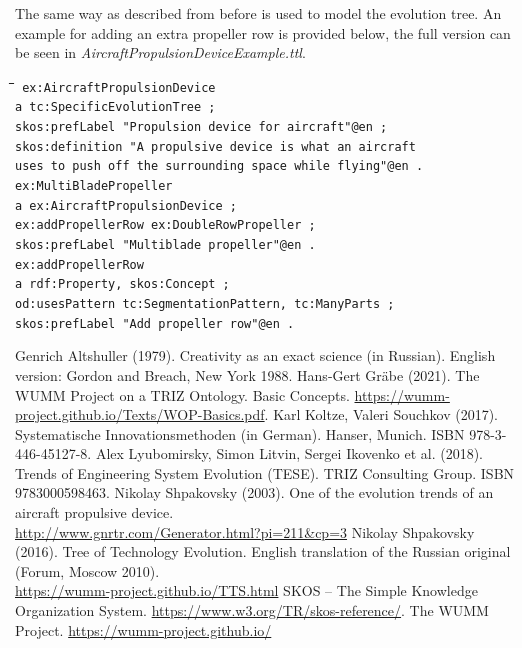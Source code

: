 \documentclass[11pt,a4paper]{article}
\newenvironment{code}{\tt \begin{tabbing}
\hskip12pt\=\hskip12pt\=\hskip12pt\=\hskip12pt\=\hskip5cm\=\hskip5cm\=\kill}
{\end{tabbing}}
\begin{document}
The same way as described from before is used to model the evolution tree. An
example for adding an extra propeller row is provided below, the full version
can be seen in \textit{AircraftPropulsionDeviceExample.ttl}. 

\begin{code}\tt
ex:AircraftPropulsionDevice \\
\> a tc:SpecificEvolutionTree ; \\
\> skos:prefLabel "Propulsion device for aircraft"@en ; \\
\> skos:definition "A propulsive device is what an aircraft \\
\>\> uses to push off the surrounding space while flying"@en .\\[4pt]
ex:MultiBladePropeller \\
\> a ex:AircraftPropulsionDevice ; \\
\> ex:addPropellerRow ex:DoubleRowPropeller ; \\
\> skos:prefLabel "Multiblade propeller"@en .\\[4pt]
ex:addPropellerRow \\
\> a rdf:Property, skos:Concept ; \\
\> od:usesPattern tc:SegmentationPattern, tc:ManyParts ; \\
\> skos:prefLabel "Add propeller row"@en .
\end{code}

\begin{thebibliography}{xxx}
\raggedright
{} Genrich Altshuller (1979).  Creativity as an exact
  science (in Russian). English version: Gordon and Breach, New York 1988.
 Hans-Gert Gr\"abe (2021). The WUMM Project on a TRIZ
  Ontology. Basic Concepts.
  \url{https://wumm-project.github.io/Texts/WOP-Basics.pdf}.
 Karl Koltze, Valeri Souchkov (2017).  Systematische
  Innovationsmethoden (in German).  Hanser, Munich. ISBN 978-3-446-45127-8.
 Alex Lyubomirsky, Simon Litvin, Sergei Ikovenko et al.
  (2018). Trends of Engineering System Evolution (TESE).  TRIZ Consulting
  Group. ISBN 9783000598463.
 Nikolay Shpakovsky (2003). One of the evolution
  trends of an aircraft propulsive device.\\
  \url{http://www.gnrtr.com/Generator.html?pi=211&cp=3}
 Nikolay Shpakovsky (2016). Tree of Technology
  Evolution. English translation of the Russian original (Forum, Moscow
  2010).\\ \url{https://wumm-project.github.io/TTS.html}
 SKOS -- The Simple Knowledge Organization System.
  \url{https://www.w3.org/TR/skos-reference/}.  
 The WUMM Project. \url{https://wumm-project.github.io/} 
\end{thebibliography}
\end{document}

